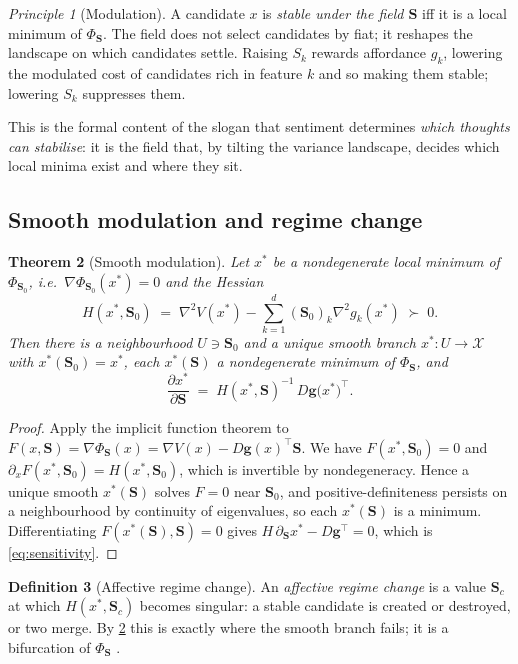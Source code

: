 \documentclass[11pt,a4paper]{article}
\theoremstyle{plain}
\newtheorem{theorem}{Theorem}[section]
\theoremstyle{definition}
\newtheorem{definition}[theorem]{Definition}
\theoremstyle{remark}
\newtheorem{principle}[theorem]{Principle}
\newcommand{\field}{\mathbf{S}}               %
\newcommand{\feat}{\mathbf{g}}                %
\newcommand{\Pot}{\Phi}                       %
\begin{document}
\begin{principle}[Modulation]
\label{prin:modulation}
A candidate $x$ is \emph{stable under the field $\field$} iff it is a local
minimum of $\Pot_\field$. The field does not select candidates by fiat; it
reshapes the landscape on which candidates settle. Raising $S_k$ rewards
affordance $g_k$, lowering the modulated cost of candidates rich in feature $k$
and so making them stable; lowering $S_k$ suppresses them.
\end{principle}

This is the formal content of the slogan that sentiment determines \emph{which
thoughts can stabilise}: it is the field that, by tilting the variance
landscape, decides which local minima exist and where they sit.

\subsection{Smooth modulation and regime change}

\begin{theorem}[Smooth modulation]
\label{thm:modulation}
Let $x^\ast$ be a nondegenerate local minimum of $\Pot_{\field_0}$, i.e.\
$\nabla\Pot_{\field_0}(x^\ast)=0$ and the Hessian
\[
H(x^\ast,\field_0)\;=\;\nabla^2 V(x^\ast)-\sum_{k=1}^{d}(\field_0)_k
\nabla^2 g_k(x^\ast)\;\succ\;0 .
\]
Then there is a neighbourhood $U\ni\field_0$ and a unique smooth branch
$x^\ast\colon U\to\mathcal{X}$ with $x^\ast(\field_0)=x^\ast$, each
$x^\ast(\field)$ a nondegenerate minimum of $\Pot_\field$, and
\begin{equation}
\frac{\partial x^\ast}{\partial\field}\;=\;H(x^\ast,\field)^{-1}\,
D\feat\big(x^\ast\big)^{\!\top}.
\label{eq:sensitivity}
\end{equation}
\end{theorem}
\begin{proof}
Apply the implicit function theorem to $F(x,\field)=\nabla\Pot_\field(x)=
\nabla V(x)-D\feat(x)^{\top}\field$. We have $F(x^\ast,\field_0)=0$ and
$\partial_x F(x^\ast,\field_0)=H(x^\ast,\field_0)$, which is invertible by
nondegeneracy. Hence a unique smooth $x^\ast(\field)$ solves $F=0$ near
$\field_0$, and positive-definiteness persists on a neighbourhood by continuity
of eigenvalues, so each $x^\ast(\field)$ is a minimum. Differentiating
$F(x^\ast(\field),\field)=0$ gives $H\,\partial_\field x^\ast - D\feat^{\top}=0$,
which is \cref{eq:sensitivity}.
\end{proof}

\begin{definition}[Affective regime change]
\label{def:bifurcation}
An \emph{affective regime change} is a value $\field_c$ at which
$H(x^\ast,\field_c)$ becomes singular: a stable candidate is created or
destroyed, or two merge. By \cref{thm:modulation} this is exactly where the
smooth branch fails; it is a bifurcation of $\Pot_\field$
\citep{strogatz2015,hirsch2013}.
\end{definition}
\end{document}
